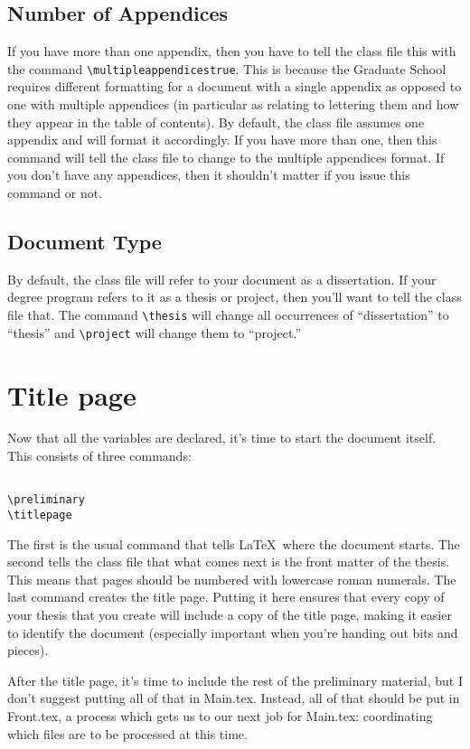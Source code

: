 \subsection{Number of Appendices}
If you have more than one appendix, then you have to tell the class file this with the command \verb=\multipleappendicestrue=.  This is because the Graduate School requires different formatting for a document with a single appendix as opposed to one with multiple appendices (in particular as relating to lettering them and how they appear in the table of contents).  By default, the class file assumes one appendix and will format it accordingly.  If you have more than one, then this command will tell the class file to change to the multiple appendices format.  If you don't have any appendices, then it shouldn't matter if you issue this command or not.

\subsection{Document Type}
By default, the class file will refer to your document as a dissertation.  If your degree program refers to it as a thesis or project, then you'll want to tell the class file that.  The command \verb=\thesis= will change all occurrences of ``dissertation'' to ``thesis'' and \verb=\project= will change them to ``project.''

\section{Title page}

Now that all the variables are declared, it's time to start the document itself.  This consists of three commands:

\begin{verbatim}

\preliminary
\titlepage
\end{verbatim}

The first is the usual command that tells \LaTeX\ where the document starts.  The second tells the class file that what comes next is the front matter of the thesis.  This means that pages should be numbered with lowercase roman numerals.  The last command creates the title page.  Putting it here ensures that every copy of your thesis that you create will include a copy of the title page, making it easier to identify the document (especially important when you're handing out bits and pieces).

After the title page, it's time to include the rest of the preliminary material, but I don't suggest putting all of that in Main.tex.  Instead, all of that should be put in Front.tex, a process which gets us to our next job for Main.tex: coordinating which files are to be processed at this time.

